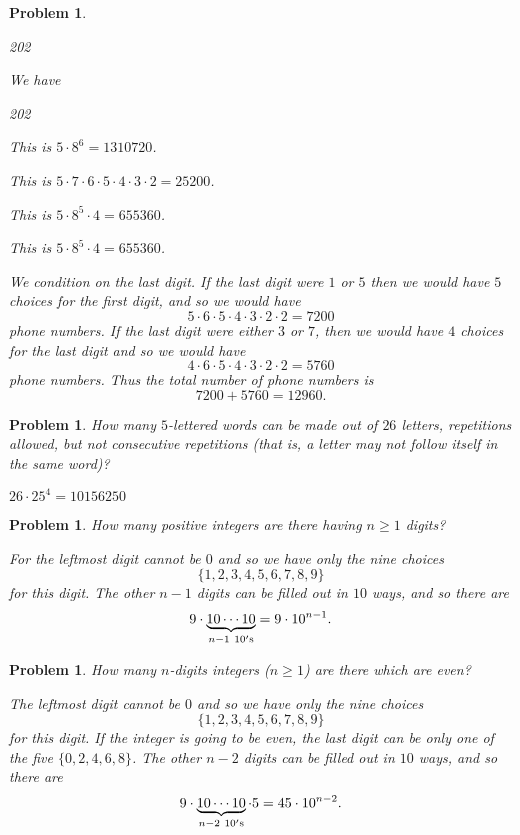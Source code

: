 \documentclass[11pt, openany]{book}
\theoremstyle{change} \theoremheaderfont{\blue\sffamily\bfseries}
\newtheorem{pro}[thm]{Problem}
\theoremstyle{nonumberplain} \theoremheaderfont{\sffamily\bfseries}
\newcommand{\í}{\'{\i}}
\begin{document}
\begin{multicols}{2}
\begin{pro}
\begin{dingautolist}{202}
\end{dingautolist}
\begin{answer}We have \begin{dingautolist}{202} \item This is $ 5\cdot 8^6 =
1310720$.
 \item This is $5\cdot 7\cdot 6 \cdot 5 \cdot 4 \cdot 3 \cdot 2
= 25200  $. \item  This is $5\cdot 8^5 \cdot 4 = 655360 $.\item This
is $5\cdot 8^5 \cdot 4 = 655360 $. \item  We condition on the last
digit. If the last digit were $1$ or $5$ then we would have $5$
choices for the first digit, and so we would have $$5\cdot 6 \cdot
5\cdot 4 \cdot 3\cdot 2 \cdot 2 = 7200
$$ phone numbers. If the last digit were either $3$ or $7$, then
we would have $4$ choices for the last digit and so we would
have$$4\cdot 6\cdot 5 \cdot 4 \cdot 3\cdot 2 \cdot 2  = 5760   $$
phone numbers. Thus the total number of phone numbers is $$7200 +
5760 = 12960.
$$

\end{dingautolist}
\end{answer}
\end{pro}


       \begin{pro}
How many $5$-lettered words can be made out of $26$ letters,
repetitions allowed, but not consecutive repetitions (that is, a
letter may not follow itself in the same word)?

\begin{answer}$26\cdot 25^4 = 10156250$

\end{answer}
    \end{pro}
\begin{pro}How many positive integers are there having $n\geq 1$
digits?
\begin{answer} For the leftmost digit cannot be $0$ and so we have only
the nine choices
$$\{1,2,3,4,5,6,7,8,9\}$$ for this digit. The other $n - 1$ digits
can be filled out in $10$ ways, and so there are
$$ 9\cdot\underbrace{10\cdots 10}_{n-1 \ 10'{\rm s}} = 9\cdot 10^{n - 1}. $$
\end{answer}
\end{pro}

\begin{pro}How many $n$-digits integers ($n \geq 1$) are there
which are even? \begin{answer}The leftmost digit cannot be $0$ and
so we have only the nine choices
$$\{1,2,3,4,5,6,7,8,9\}$$ for this digit. If the integer is going
to be even, the last digit can be only one of the five
$\{0,2,4,6,8\}$. The other $n - 2$ digits can be filled out in $10$
ways, and so there are
$$ 9\cdot \underbrace{10\cdots 10}_{n-2 \ 10'{\rm s}}\cdot 5 = 45\cdot 10^{n - 2}. $$
\end{answer}
\end{pro}


\end{multicols}
\end{document}
